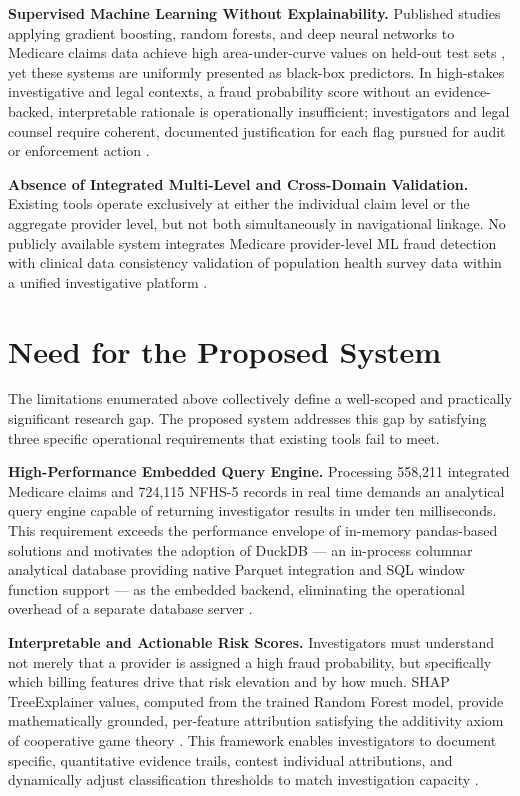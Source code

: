 \textbf{Supervised Machine Learning Without Explainability.} Published studies applying gradient boosting, random forests, and deep neural networks to Medicare claims data achieve high area-under-curve values on held-out test sets \cite{b11}\cite{b12}, yet these systems are uniformly presented as black-box predictors. In high-stakes investigative and legal contexts, a fraud probability score without an evidence-backed, interpretable rationale is operationally insufficient; investigators and legal counsel require coherent, documented justification for each flag pursued for audit or enforcement action \cite{b9}.

\textbf{Absence of Integrated Multi-Level and Cross-Domain Validation.} Existing tools operate exclusively at either the individual claim level or the aggregate provider level, but not both simultaneously in navigational linkage. No publicly available system integrates Medicare provider-level ML fraud detection with clinical data consistency validation of population health survey data within a unified investigative platform \cite{b1}.

\section{Need for the Proposed System}
\label{sec:need}

The limitations enumerated above collectively define a well-scoped and practically significant research gap. The proposed system addresses this gap by satisfying three specific operational requirements that existing tools fail to meet.

\textbf{High-Performance Embedded Query Engine.} Processing 558,211 integrated Medicare claims and 724,115 NFHS-5 records in real time demands an analytical query engine capable of returning investigator results in under ten milliseconds. This requirement exceeds the performance envelope of in-memory pandas-based solutions and motivates the adoption of DuckDB --- an in-process columnar analytical database providing native Parquet integration and SQL window function support --- as the embedded backend, eliminating the operational overhead of a separate database server \cite{b17}.

\textbf{Interpretable and Actionable Risk Scores.} Investigators must understand not merely that a provider is assigned a high fraud probability, but specifically which billing features drive that risk elevation and by how much. SHAP TreeExplainer values, computed from the trained Random Forest model, provide mathematically grounded, per-feature attribution satisfying the additivity axiom of cooperative game theory \cite{b6}. This framework enables investigators to document specific, quantitative evidence trails, contest individual attributions, and dynamically adjust classification thresholds to match investigation capacity \cite{b19}.

